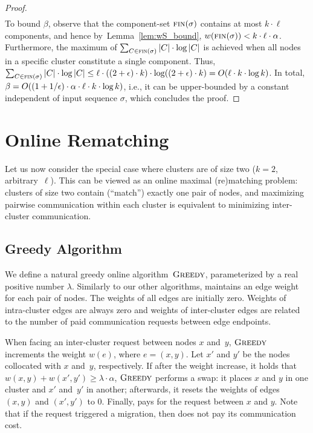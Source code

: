 \begin{proof}
\begin{align*}
\end{align*}
To bound $\beta$, observe that the component-set $\textsc{fin}(\sigma)$
contains at most $k \cdot \ell$ components, and hence
by~Lemma~\ref{lem:wS_bound}, $w(\textsc{fin}(\sigma)) < k \cdot \ell \cdot
\alpha$. Furthermore, the maximum of $\sum_{C \in \textsc{fin}(\sigma)} |C| \cdot
\log |C|$ is achieved when all nodes in a specific cluster constitute a single
component. Thus, $\sum_{C \in \textsc{fin}(\sigma)} |C| \cdot \log |C|
\leq \ell \cdot ((2+\epsilon) \cdot k) \cdot \log ((2+\epsilon) \cdot k) = O(\ell
\cdot k \cdot \log k)$.
In total, $\beta = O((1 + 1/\epsilon) \cdot \alpha \cdot \ell \cdot k \cdot \log k)$, 
i.e., it can be upper-bounded by a constant independent of input sequence $\sigma$,
which concludes the proof.
\end{proof}




\section{Online Rematching}
\label{sec:k-two}

Let us now consider the special case where clusters are of size two ($k=2$,
arbitrary~$\ell$). This can be viewed as an online maximal (re)matching problem:
clusters of size two contain (``match'') exactly one pair of nodes, and
maximizing pairwise communication within each cluster is equivalent to
minimizing inter-cluster communication. 


\subsection{Greedy Algorithm}

We define a natural greedy online algorithm~$\textsc{Greedy}$, parameterized by a real
positive number $\lambda$. Similarly to our other algorithms,
\GREEDY  maintains an edge weight for each pair of nodes. 
The weights of all edges are initially zero. Weights of intra-cluster edges
are always zero and weights of inter-cluster edges are related to the number
of paid communication requests between edge endpoints. 

When facing an inter-cluster request between nodes $x$
and~$y$, $\textsc{Greedy}$ increments the weight $w(e)$, where $e = (x,y)$. Let $x'$
and $y'$ be the nodes collocated with $x$ and~$y$, respectively. If after the
weight increase, it holds that $w(x,y) + w(x',y') \geq \lambda
\cdot \alpha$, $\textsc{Greedy}$ performs a swap: it places $x$ and $y$ in one
cluster and $x'$ and~$y'$ in another; afterwards, it resets the weights of
edges $(x,y)$ and $(x',y')$ to 0. Finally, \GREEDY pays for the request
between $x$ and $y$. Note that if the request triggered a migration, then
\GREEDY does not pay its communication cost.


